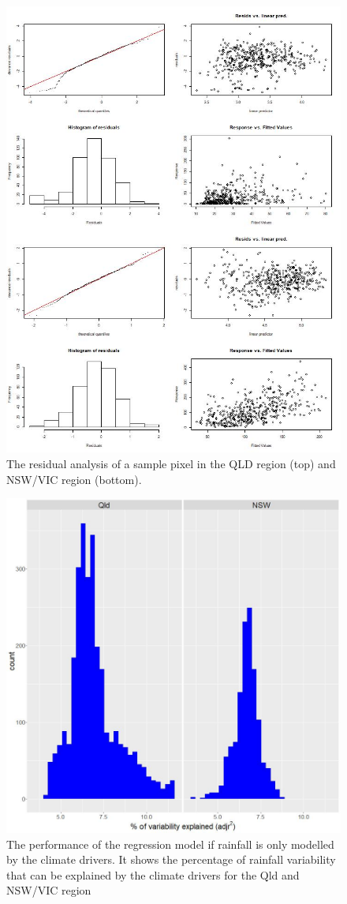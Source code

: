 \documentclass[]{elsarticle} %
\theoremstyle{definition}
\theoremstyle{definition}
\theoremstyle{definition}
\theoremstyle{remark}
\begin{document}
\begin{figure}
\includegraphics[width=0.9\linewidth]{figures/gam_check} \caption{The residual analysis of a sample pixel in the QLD region (top) and NSW/VIC region (bottom).}\label{fig:residuals}
\end{figure}

\begin{figure}
\includegraphics[width=0.9\linewidth]{figures/soi_explhistogram} \caption{The performance of the regression model if rainfall is only modelled by the climate drivers. It shows the percentage of rainfall variability that can be explained by the climate drivers for the Qld and NSW/VIC region}\label{fig:rsq}
\end{figure}
\end{document}
